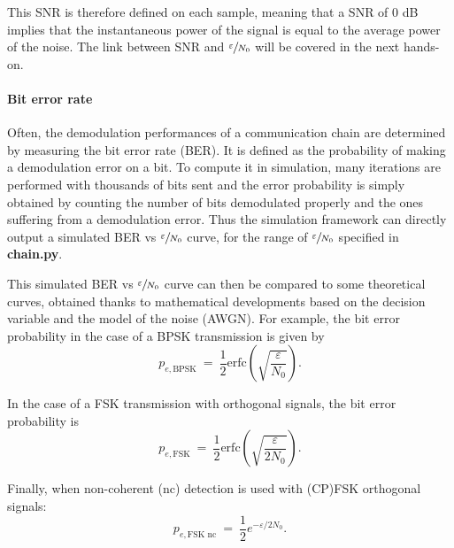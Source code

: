 This SNR is therefore defined on each sample, meaning that a SNR of 0 dB implies that the instantaneous power of the signal is equal to the average power of the noise. The link between SNR and $\sfrac{\varepsilon}{N_0}$ will be covered in the next hands-on.



\paragraph{Bit error rate}
Often, the demodulation performances of a communication chain are determined by measuring the bit error rate (BER). It is defined as the probability of making a demodulation error on a bit. To compute it in simulation, many iterations are performed with thousands of bits sent and the error probability is simply obtained by counting the number of bits demodulated properly and the ones suffering from a demodulation error. Thus the simulation framework can directly output a simulated BER vs $\sfrac{\varepsilon}{N_0}$ curve, for the range of $\sfrac{\varepsilon}{N_0}$ specified in \textbf{chain.py}.

This simulated BER vs $\sfrac{\varepsilon}{N_0}$ curve can then be compared to some theoretical curves, obtained thanks to mathematical developments based on the decision variable and the model of the noise (AWGN). For example, the bit error probability in the case of a BPSK transmission is given by
\begin{equation*}
    p_{e,\text{BPSK}}\:=\:\frac{1}{2} \text{erfc}\left(\sqrt{\frac{\varepsilon}{N_0}}\right).
\end{equation*}

In the case of a FSK transmission with orthogonal signals, the bit error probability is
\begin{equation*}
    p_{e,\text{FSK}}\:=\:\frac{1}{2} \text{erfc}\left(\sqrt{\frac{\varepsilon}{2N_0}}\right).
\end{equation*}

Finally, when non-coherent (nc) detection is used with (CP)FSK orthogonal signals:
\begin{equation*}
    p_{e,\text{FSK nc}}\:=\:\frac{1}{2}e^{-\varepsilon/2N_0}.
\end{equation*}

